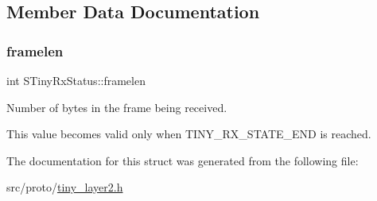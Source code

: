 \subsection{Member Data Documentation}
\mbox{\label{structSTinyRxStatus_ad9f6055b8e74f10894c48ff2247f51c4}} 
\subsubsection{\texorpdfstring{framelen}{framelen}}
{\footnotesize\ttfamily int S\+Tiny\+Rx\+Status\+::framelen}



Number of bytes in the frame being received. 

This value becomes valid only when T\+I\+N\+Y\+\_\+\+R\+X\+\_\+\+S\+T\+A\+T\+E\+\_\+\+E\+ND is reached. 

The documentation for this struct was generated from the following file\+:\begin{DoxyCompactItemize}
\item 
src/proto/\hyperlink{tiny__layer2_8h}{tiny\+\_\+layer2.\+h}\end{DoxyCompactItemize}
